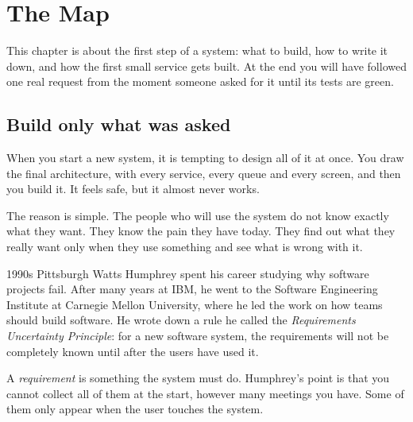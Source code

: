 \chapter{The Map}
\label{ch:map}


This chapter is about the first step of a system: what to build, how to write
it down, and how the first small service gets built. At the end you will have
followed one real request from the moment someone asked for it until its tests
are green.

\section{Build only what was asked}

When you start a new system, it is tempting to design all of it at once. You
draw the final architecture, with every service, every queue and every screen,
and then you build it. It feels safe, but it almost never works.

The reason is simple. The people who will use the system do not know exactly
what they want. They know the pain they have today. They find out what they
really want only when they use something and see what is wrong with it.

\begin{history}{1990s \textperiodcentered{} Pittsburgh}
Watts Humphrey spent his career studying why software projects fail. After
many years at IBM, he went to the Software Engineering Institute at Carnegie
Mellon University, where he led the work on how teams should build software.
He wrote down a rule he called the \emph{Requirements Uncertainty Principle}:
for a new software system, the requirements will not be completely known
until after the users have used it.

A \emph{requirement} is something the system must do. Humphrey's point is that
you cannot collect all of them at the start, however many meetings you have.
Some of them only appear when the user touches the system.
\end{history}

